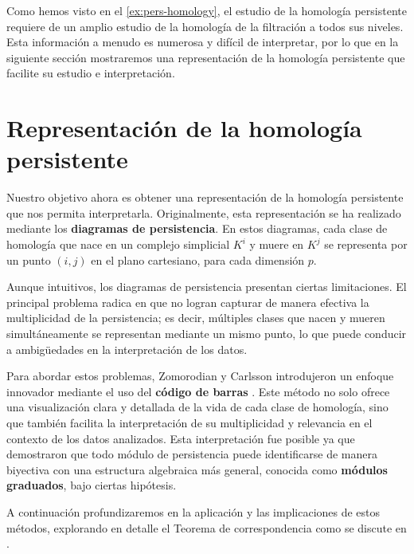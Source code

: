Como hemos visto en el \autoref{ex:pers-homology}, el estudio de la homología
persistente requiere de un amplio estudio de la homología de la filtración a
todos sus niveles. Esta información a menudo es numerosa y difícil de interpretar,
por lo que en la siguiente sección mostraremos una representación de la
homología persistente que facilite su estudio e interpretación.

\section{Representación de la homología persistente}
\label{sec:barcode}

Nuestro objetivo ahora es obtener una representación de la homología persistente
que nos permita interpretarla. Originalmente, esta representación se ha realizado
mediante los \textbf{diagramas de persistencia}. En estos diagramas, cada clase
de homología que nace en un complejo simplicial $K^{i}$ y muere en $K^{j}$ se
representa por un punto $(i, j)$ en el plano cartesiano, para cada dimensión $p$.

Aunque intuitivos, los diagramas de persistencia presentan ciertas limitaciones.
El principal problema radica en que no logran capturar de manera efectiva la multiplicidad
de la persistencia; es decir, múltiples clases que nacen y mueren simultáneamente
se representan mediante un mismo punto, lo que puede conducir a ambigüedades en
la interpretación de los datos.

Para abordar estos problemas, Zomorodian y Carlsson introdujeron un enfoque innovador
mediante el uso del \textbf{código de barras} \cite{zomorodian2004computing}. Este
método no solo ofrece una visualización clara y detallada de la vida de cada clase
de homología, sino que también facilita la interpretación de su multiplicidad y
relevancia en el contexto de los datos analizados. Esta interpretación fue posible
ya que demostraron que todo módulo de persistencia puede identificarse de manera
biyectiva con una estructura algebraica más general, conocida como \textbf{módulos
	graduados}, bajo ciertas hipótesis.

A continuación profundizaremos en la aplicación y las implicaciones de estos
métodos, explorando en detalle el Teorema de correspondencia como se discute en \cite{Corbet_2018}.

